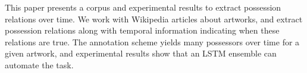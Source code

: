 This paper presents a corpus and experimental results to extract possession relations over time. We work with Wikipedia articles about artworks, and extract possession relations along with temporal information indicating when these relations are true. The annotation scheme yields many possessors over time for a given artwork, and experimental results show that an LSTM ensemble can automate the task.
